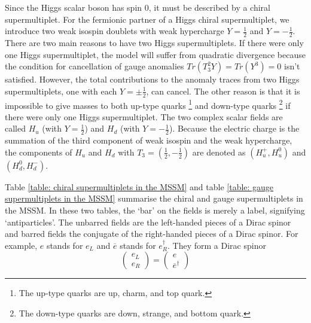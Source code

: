 \documentclass[12pt]{report}
\begin{document}
Since the Higgs scalar boson has spin $0$, it must be described by a chiral supermultiplet.
For the fermionic partner of a Higgs chiral supermultiplet, we introduce two weak isospin doublets with weak hypercharge $Y = \frac{1}{2}$ and $Y = -\frac{1}{2}$.
There are two main reasons to have two Higgs supermultiplets.
If there were only one Higgs supermultiplet, the model will suffer from quadratic divergence because the condition for cancellation of gauge anomalies $Tr(T^{2}_{3} Y) = Tr(Y^{3}) = 0$ isn't satisfied.
However, the total contributions to the anomaly traces from two Higgs supermultiplets, one with each $Y = \pm \frac{1}{2}$, can cancel.
The other reason is that it is impossible to give masses to both up-type quarks \footnote{The up-type quarks are up, charm, and top quark.} and down-type quarks \footnote{The down-type quarks are down, strange, and bottom quark.} if there were only one Higgs supermultiplet.
The two complex scalar fields are called $H_{u}$ (with $Y = \frac{1}{2}$) and $H_{d}$ (with $Y = -\frac{1}{2}$).
Because the electric charge is the summation of the third component of weak isospin and the weak hypercharge, the components of $H_{u}$ and $H_{d}$ with $T_{3} = (\frac{1}{2}, -\frac{1}{2})$ are denoted as $(H^{+}_{u}, H^{0}_{u})$ and $(H^{0}_{d}, H^{-}_{d})$.

Table \ref{table: chiral supermultiplets in the MSSM} and table \ref{table: gauge supermultiplets in the MSSM} summarise the chiral and gauge supermultiplets in the MSSM.
In these two tables, the `bar' on the fields is merely a label, signifying `antiparticles'.%
The unbarred fields are the left-handed pieces of a Dirac spinor and barred fields the conjugate of the right-handed pieces of a Dirac spinor.
For example, $e$ stands for $e_{L}$ and $\overline{e}$ stands for $e^{\dag}_{R}$.
They form a Dirac spinor
\begin{equation}
\left( \begin{array}{c} e_{L}\\ {e}_{R} \end{array} \right) = \left( \begin{array}{c} e\\ \overline{e}^{\dag} \end{array} \right)
\end{equation}
\end{document}

